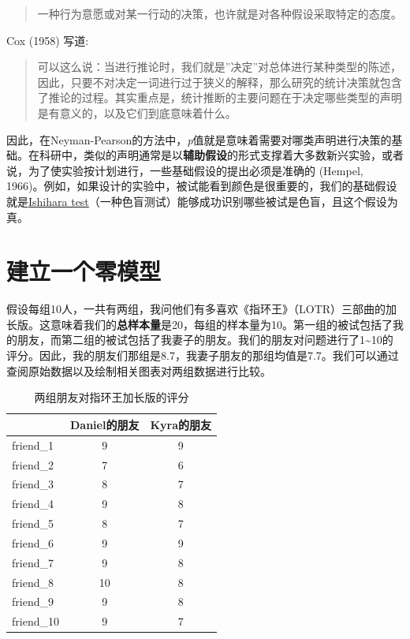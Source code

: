 \documentclass[
  letterpaper,
  DIV=11,
  numbers=noendperiod]{scrreprt}
\begin{document}
\begin{quote}
一种行为意愿或对某一行动的决策，也许就是对各种假设采取特定的态度。
\end{quote}

Cox (1958) 写道:

\begin{quote}
可以这么说：当进行推论时，我们就是''决定''对总体进行某种类型的陈述，因此，只要不对决定一词进行过于狭义的解释，那么研究的统计决策就包含了推论的过程。其实重点是，统计推断的主要问题在于决定哪些类型的声明是有意义的，以及它们到底意味着什么。
\end{quote}

因此，在Neyman-Pearson的方法中，\emph{p}值就是意味着需要对哪类声明进行决策的基础。在科研中，类似的声明通常是以\textbf{辅助假设}的形式支撑着大多数新兴实验，或者说，为了使实验按计划进行，一些基础假设的提出必须是准确的
(Hempel,
1966)。例如，如果设计的实验中，被试能看到颜色是很重要的，我们的基础假设就是\href{https://en.wikipedia.org/wiki/Ishihara_test}{Ishihara
test}（一种色盲测试）能够成功识别哪些被试是色盲，且这个假设为真。

\hypertarget{ux5efaux7acbux4e00ux4e2aux96f6ux6a21ux578b}{%
\section{建立一个零模型}\label{ux5efaux7acbux4e00ux4e2aux96f6ux6a21ux578b}}

假设每组10人，一共有两组，我问他们有多喜欢《指环王》（LOTR）三部曲的加长版。这意味着我们的\textbf{总样本量}是20，每组的样本量为10。第一组的被试包括了我的朋友，而第二组的被试包括了我妻子的朋友。我们的朋友对问题进行了1\textasciitilde10的评分。因此，我的朋友们那组是8.7，我妻子朋友的那组均值是7.7。我们可以通过查阅原始数据以及绘制相关图表对两组数据进行比较。

\begin{table}

\caption{两组朋友对指环王加长版的评分}
\begin{tabular}[t]{lcc}
\toprule
 & Daniel的朋友 & Kyra的朋友\\
\midrule
friend\_1 & 9 & 9\\
friend\_2 & 7 & 6\\
friend\_3 & 8 & 7\\
friend\_4 & 9 & 8\\
friend\_5 & 8 & 7\\
\addlinespace
friend\_6 & 9 & 9\\
friend\_7 & 9 & 8\\
friend\_8 & 10 & 8\\
friend\_9 & 9 & 8\\
friend\_10 & 9 & 7\\
\bottomrule
\end{tabular}
\end{table}
\end{document}
